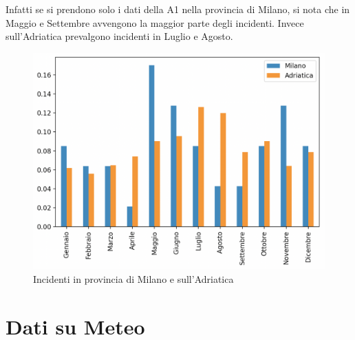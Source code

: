 \documentclass[a4paper]{report}
\begin{document}
Infatti se si prendono solo i dati della A1 nella provincia di Milano, si nota 
che in Maggio e Settembre avvengono la maggior parte degli incidenti.
Invece sull'Adriatica prevalgono incidenti in Luglio e Agosto.
\begin{figure}[!ht]
    \includegraphics[width=\linewidth]{../src/incidenti/incidenti_aci/milano_adriatica.png}
    \caption{Incidenti in provincia di Milano e sull'Adriatica}
    \label{fig:milano_adriatica}
\end{figure}

\newpage
\chapter{Dati su Meteo}



\end{document}
